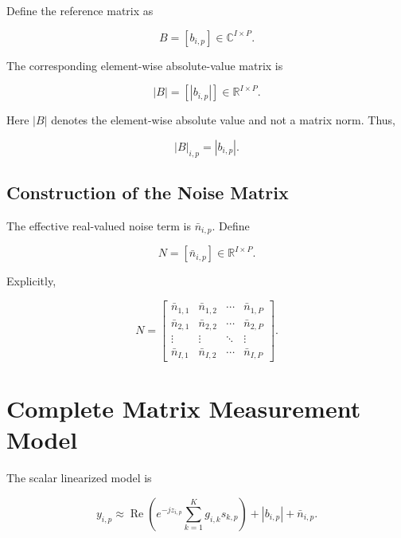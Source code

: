 \documentclass[12pt,a4paper]{article}
\begin{document}
Define the reference matrix as

\begin{equation}
\boxed{
B=[b_{i,p}]
\in
\mathbb{C}^{I\times P}
}.
\tag{156}
\end{equation}

The corresponding element-wise absolute-value matrix is

\begin{equation}
\boxed{
|B|
=
[|b_{i,p}|]
\in
\mathbb{R}^{I\times P}
}.
\tag{157}
\end{equation}

Here $|B|$ denotes the element-wise absolute value and not a matrix norm. Thus,

\begin{equation}
|B|_{i,p}
=
|b_{i,p}|.
\tag{158}
\end{equation}

\subsection{Construction of the Noise Matrix}

The effective real-valued noise term is $\bar n_{i,p}$. Define

\begin{equation}
\boxed{
N=[\bar n_{i,p}]
\in
\mathbb{R}^{I\times P}
}.
\tag{159}
\end{equation}

Explicitly,

\begin{equation}
N=
\begin{bmatrix}
\bar n_{1,1} & \bar n_{1,2} & \cdots & \bar n_{1,P}\\
\bar n_{2,1} & \bar n_{2,2} & \cdots & \bar n_{2,P}\\
\vdots & \vdots & \ddots & \vdots\\
\bar n_{I,1} & \bar n_{I,2} & \cdots & \bar n_{I,P}
\end{bmatrix}.
\tag{160}
\end{equation}

\section{Complete Matrix Measurement Model}

The scalar linearized model is

\begin{equation}
y_{i,p}
\approx
\operatorname{Re}
\left(
e^{-jz_{i,p}}
\sum_{k=1}^{K}
g_{i,k}s_{k,p}
\right)
+
|b_{i,p}|
+
\bar n_{i,p}.
\tag{161}
\end{equation}
\end{document}
